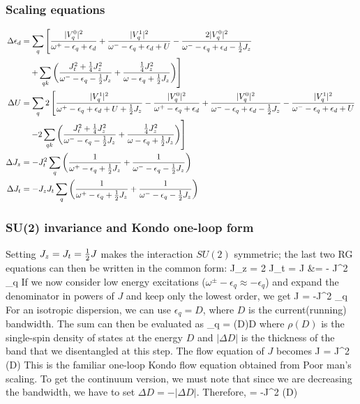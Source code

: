 \documentclass[14pt]{extarticle}
\numberwithin{equation}{section}
\begin{document}
{\subsubsection{Scaling equations}
\begin{align*}
\Delta \epsilon_d &= \sum_q \left[\frac{|V_q^0|^2}{\omega^+ - \epsilon_q + \epsilon_d } + \frac{|V_q^1|^2}{\omega^- - \epsilon_q + \epsilon_d  + U} - \frac{2|V_q^0|^2}{\omega^- - \epsilon_q + \epsilon_d - \frac{1}{2} J_z} \right.\\
		  &\quad\left.+ \sum_{qk}\left({\frac{J_t^2 + \frac{1}{4}J_z^2}{\omega^- - \epsilon_q - \frac{1}{2} J_z} + \frac{\frac{1}{4}J_z^2}{\omega - \epsilon_q + \frac{1}{2} J_z}}\right)\right]\\
	\Delta U &= \sum_q 2\left[\frac{|V_q^1|^2}{\omega^+ - \epsilon_q + \epsilon_d + U + \frac{1}{2} J_z} - \frac{|V_q^0|^2}{\omega^+ - \epsilon_q + \epsilon_d} + \frac{|V_q^0|^2}{\omega^- - \epsilon_q + \epsilon_d  - \frac{1}{2} J_z} - \frac{|V_q^1|^2}{\omega^- - \epsilon_q + \epsilon_d + U} \right.\\
		 &\quad\left.- 2\sum_{qk}\left({\frac{J_t^2 + \frac{1}{4}J_z^2}{\omega^- - \epsilon_q - \frac{1}{2} J_z} + \frac{\frac{1}{4}J_z^2}{\omega - \epsilon_q + \frac{1}{2} J_z}}\right)\right]\\
\Delta J_z &= -J_t^2 \sum_q \left({\frac{1}{\omega^+ - \epsilon_q  + \frac{1}{2} J_z} + \frac{1}{\omega^- - \epsilon_q  - \frac{1}{2} J_z}}\right)\\
\Delta J_t &= - J_z J_t \sum_q \left({\frac{1}{\omega^+ - \epsilon_q  + \frac{1}{2} J_z} + \frac{1}{\omega^- - \epsilon_q  - \frac{1}{2} J_z}}\right)
\end{align*}
\subsubsection{SU(2) invariance and Kondo one-loop form}
Setting \(J_z = J_t = \frac{1}{2} J\) makes the interaction \(SU(2)\) symmetric; the last two RG equations can then be written in the common form:
\Delta J_z = 2 \Delta J_t = \Delta J &= - \hf J^2 \sum_q 
\eeq
If we now consider low energy excitations (\(\omega^\pm - \epsilon_q \approx  - \epsilon_q\)) and expand the denominator in powers of \(J\) and keep only the lowest order, we get
\beq
\Delta J = -\hf J^2 \sum_q 
\eeq
For an isotropic dispersion, we can use \(\epsilon_q = D\), where \(D\) is the current(running) bandwidth. The sum can then be evaluated as
\beq
\sum_q = \rho(D)\Delta D
\eeq
where \(\rho(D)\) is the single-spin density of states at the energy \(D\) and \(|\Delta D|\) is the thickness of the band that we disentangled at this step. The flow equation of \(J\) becomes
\beq
\Delta J = J^2 \rho(D)
\eeq
This is the familiar one-loop Kondo flow equation obtained from Poor man's scaling. To get the continuum version, we must note that since we are decreasing the bandwidth, we have to set \(\Delta D = -|\Delta D|\). Therefore,
\beq
{} = -J^2 \rho(D)
\eeq
}
\end{document}

